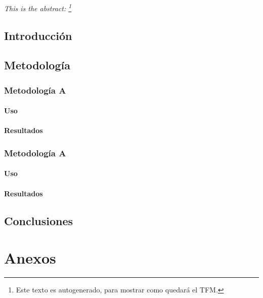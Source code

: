 \documentclass[a4paper,12pt]{report}
\begin{document}

\par\textit{This is the abstract: \lipsum[1]\parencite{Loremips46:online}\footnote{Este texto es autogenerado, para mostrar como quedará el TFM.}}


\clearpage
\tableofcontents

\chapter{Introducción}
\lipsum[2]

\chapter{Metodología}
\lipsum[3]
\section{Metodología A}
\lipsum[4]
\subsection{Uso}
\lipsum[5]
\subsection{Resultados}
\lipsum[6]
\section{Metodología A}
\lipsum[7]
\subsection{Uso}
\lipsum[8]
\subsection{Resultados}
\lipsum[9]

\chapter{Conclusiones}
\lipsum[10]

\part{Anexos}

\newpage
\listoftables

\printbibliography
\end{document}
